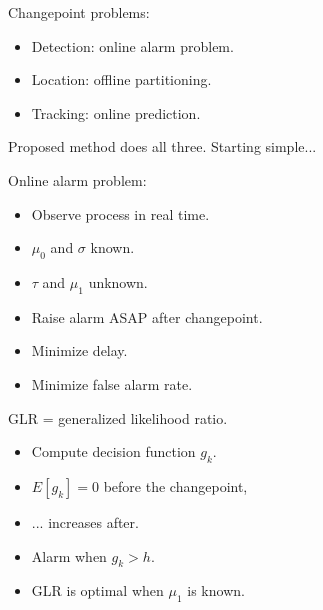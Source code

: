 \documentclass[pdf,letterpaper,allen]{prosper}
\begin{document}
\begin{slide}{}

Changepoint problems:

\begin{itemize}

\item Detection: online alarm problem.

\item {\gray Location: offline partitioning.}

\item {\gray Tracking: online prediction.}

\end{itemize}

Proposed method does all three.  Starting simple...

\end{slide}



\begin{slide}{}

Online alarm problem:

\begin{itemize}

\item Observe process in real time.

\item $\mu_0$ and $\sigma$ known.

\item $\tau$ and $\mu_1$ unknown.

\item Raise alarm ASAP after changepoint.

\item Minimize delay.

\item Minimize false alarm rate.

\end{itemize}


\end{slide}



\begin{slide}{}

GLR = generalized likelihood ratio.

\begin{itemize}

\item Compute decision function $g_k$.

\item $E[g_k] = 0$ before the changepoint,

\item ... increases after.

\item Alarm when $g_k > h$.

\item GLR is optimal when $\mu_1$ is known.

\end{itemize}


\end{slide}
\end{document}
